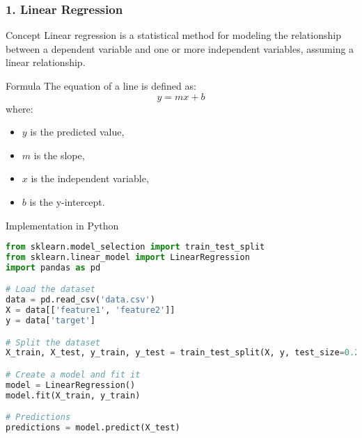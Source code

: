 \documentclass[aspectratio=169]{beamer}
\begin{document}
\begin{frame}[fragile]
    \frametitle{1. Linear Regression}
    \begin{block}{Concept}
        Linear regression is a statistical method for modeling the relationship between a dependent variable and one or more independent variables, assuming a linear relationship.
    \end{block}

    \begin{block}{Formula}
        The equation of a line is defined as:
        \begin{equation}
            y = mx + b
        \end{equation}
        where:
        \begin{itemize}
            \item \(y\) is the predicted value,
            \item \(m\) is the slope,
            \item \(x\) is the independent variable,
            \item \(b\) is the y-intercept.
        \end{itemize}
    \end{block}
    
    \begin{block}{Implementation in Python}
    \begin{lstlisting}[language=Python, frame=single]
from sklearn.model_selection import train_test_split
from sklearn.linear_model import LinearRegression
import pandas as pd

# Load the dataset
data = pd.read_csv('data.csv')
X = data[['feature1', 'feature2']]
y = data['target']

# Split the dataset
X_train, X_test, y_train, y_test = train_test_split(X, y, test_size=0.2, random_state=42)

# Create a model and fit it
model = LinearRegression()
model.fit(X_train, y_train)

# Predictions
predictions = model.predict(X_test)
    \end{lstlisting}
    \end{block}
\end{frame}
\end{document}

